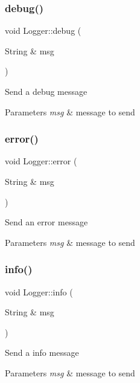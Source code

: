 \subsubsection{\texorpdfstring{debug()}{debug()}}
{\footnotesize\ttfamily void Logger\+::debug (\begin{DoxyParamCaption}\item[{String \&}]{msg }\end{DoxyParamCaption})}

Send a debug message 
\begin{DoxyParams}{Parameters}
{\em msg} & message to send \\
\hline
\end{DoxyParams}
\mbox{\label{class_logger_a5e9028a26e4eda9bfcf1eb529a888f27}} 
\subsubsection{\texorpdfstring{error()}{error()}}
{\footnotesize\ttfamily void Logger\+::error (\begin{DoxyParamCaption}\item[{String \&}]{msg }\end{DoxyParamCaption})}

Send an error message 
\begin{DoxyParams}{Parameters}
{\em msg} & message to send \\
\hline
\end{DoxyParams}
\mbox{\label{class_logger_a301deb3bca68b58a3093e9edaba6ac0b}} 
\subsubsection{\texorpdfstring{info()}{info()}}
{\footnotesize\ttfamily void Logger\+::info (\begin{DoxyParamCaption}\item[{String \&}]{msg }\end{DoxyParamCaption})}

Send a info message 
\begin{DoxyParams}{Parameters}
{\em msg} & message to send \\
\hline
\end{DoxyParams}
\mbox{\label{class_logger_a2bf9a271f43d44ae37b21eb6ee59426e}} 
